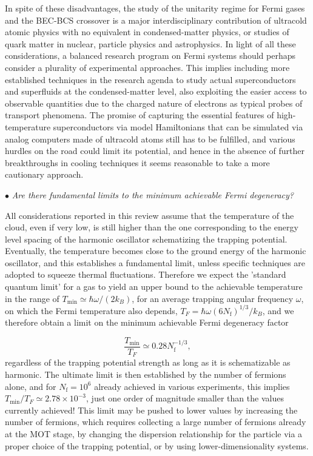 \documentclass[pra,letterpaper,twocolumn,showpacs,superscriptaddress]{revtex4}
\begin{document}
In spite of these disadvantages, the study of the unitarity regime for Fermi gases and the BEC-BCS crossover is a major interdisciplinary contribution of 
ultracold atomic physics with no equivalent in condensed-matter physics, or studies of quark matter in nuclear, particle physics and astrophysics. 
In light of all these considerations, a balanced research program on Fermi systems should perhaps consider a plurality of experimental approaches.
This implies including more established techniques in the research agenda to study actual superconductors and superfluids at the condensed-matter level, 
also exploiting the easier access to observable quantities due to the charged nature of electrons as typical probes of transport phenomena. 
The promise of capturing the essential features of high-temperature superconductors via model Hamiltonians that can be simulated via analog computers 
made of ultracold atoms still has to be fulfilled, and various hurdles on the road could limit its potential, and hence in the absence of further breakthroughs in 
cooling techniques it seems reasonable to take a more cautionary approach. 

\vspace{2.0mm}

\noindent
$\bullet$ {\sl Are there fundamental limits to the minimum achievable Fermi degeneracy?}

All considerations reported in this review assume that the temperature of the cloud, even if very low, is still higher than the one corresponding to
the energy level spacing of the harmonic oscillator schematizing the trapping potential. Eventually, the temperature becomes close to the ground 
energy of the harmonic oscillator, and this establishes a fundamental limit, unless specific techniques are adopted to squeeze thermal fluctuations.
Therefore we expect the 'standard quantum limit' for a gas to yield an upper bound to the achievable temperature in the range of 
$T_{\mathrm{min}} \simeq \hbar \omega/(2 k_B)$, for an average trapping angular frequency $\omega$, on which the Fermi temperature 
also depends, $T_F = \hbar \omega (6N_\mathrm{f})^{1/3}/k_B$, and we therefore obtain a limit on the minimum achievable 
Fermi degeneracy factor 

\begin{equation}
\frac{T_{\mathrm{min}}}{T_F} \simeq 0.28 N_\mathrm{f}^{-1/3},
\end{equation}
regardless of the trapping potential strength as long as it is schematizable as harmonic. The ultimate limit is then established by the number of 
fermions alone, and for $N_\mathrm{f} = 10^6$ already achieved in various experiments, this implies $T_{\mathrm{min}}/T_F \simeq 2.78 \times 10^{-3}$, just one 
order of magnitude smaller than the values currently achieved!
This limit may be pushed to lower values by increasing the number of fermions, which requires collecting a large number of fermions already 
at the MOT stage, by changing the dispersion relationship for the particle via a proper choice of the trapping potential, or by using lower-dimensionality 
systems.
\end{document}
